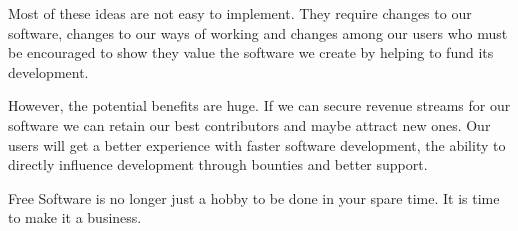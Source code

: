 Most of these ideas are not easy to implement. They require changes to our
software, changes to our ways of working and changes among our users who must be
encouraged to show they value the software we create by helping to fund its
development.

However, the potential benefits are huge. If we can secure revenue streams for
our software we can retain our best contributors and maybe attract new ones. Our
users will get a better experience with faster software development, the ability
to directly influence development through bounties and better support.

Free Software is no longer just a hobby to be done in your spare time. It is
time to make it a business.